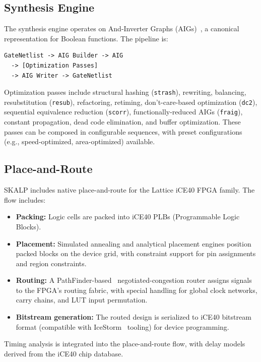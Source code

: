 \documentclass[conference]{IEEEtran}
\begin{document}
\subsection{Synthesis Engine}

The synthesis engine operates on And-Inverter Graphs (AIGs)~\cite{abc}, a canonical representation for Boolean functions. The pipeline is:

\begin{lstlisting}
GateNetlist -> AIG Builder -> AIG
  -> [Optimization Passes]
  -> AIG Writer -> GateNetlist
\end{lstlisting}

Optimization passes include structural hashing (\texttt{strash}), rewriting, balancing, resubstitution (\texttt{resub}), refactoring, retiming, don't-care-based optimization (\texttt{dc2}), sequential equivalence reduction (\texttt{scorr}), functionally-reduced AIGs (\texttt{fraig}), constant propagation, dead code elimination, and buffer optimization. These passes can be composed in configurable sequences, with preset configurations (e.g., speed-optimized, area-optimized) available.

\subsection{Place-and-Route}

SKALP includes native place-and-route for the Lattice iCE40 FPGA family. The flow includes:

\begin{itemize}
  \item \textbf{Packing:} Logic cells are packed into iCE40 PLBs (Programmable Logic Blocks).
  \item \textbf{Placement:} Simulated annealing and analytical placement engines position packed blocks on the device grid, with constraint support for pin assignments and region constraints.
  \item \textbf{Routing:} A PathFinder-based~\cite{pathfinder} negotiated-congestion router assigns signals to the FPGA's routing fabric, with special handling for global clock networks, carry chains, and LUT input permutation.
  \item \textbf{Bitstream generation:} The routed design is serialized to iCE40 bitstream format (compatible with IceStorm~\cite{icestorm} tooling) for device programming.
\end{itemize}

Timing analysis is integrated into the place-and-route flow, with delay models derived from the iCE40 chip database.
\end{document}
